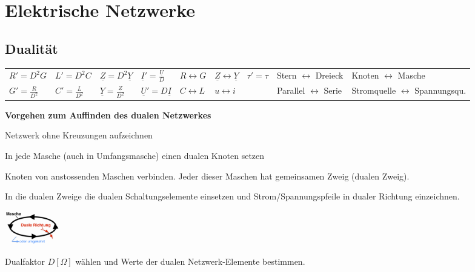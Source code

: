 \section{Elektrische Netzwerke}
\subsection{Dualität}
\begin{tabular}{llll|lllll}
	$R'=D^2G$ & 
	$L'=D^2C$ & 
	$\underline{Z} = D^2 \underline{Y}$ &  $\underline{I}'=\frac{\underline{U}}{D}$
	
	&  $R \leftrightarrow G $
	&  $\underline{Z} \leftrightarrow \underline{Y}$
	&  $\tau' = \tau$
	& Stern $\leftrightarrow$ Dreieck
	&  Knoten $\leftrightarrow$ Masche \\

	$G'=\frac{R}{D^2}$  & $C'=\frac{L}{D^2}$ & 
	$\underline{Y} = \frac{\underline{Z}}{D^2}$ & $\underline{U}'=D\underline{I}$
	
	& $C \leftrightarrow L$
	& $u \leftrightarrow i$ 
	& 
	& Parallel $\leftrightarrow$ Serie 
	& Stromquelle $\leftrightarrow$ Spannungsqu.\\
\end{tabular}

\textbf{Vorgehen zum Auffinden des dualen Netzwerkes}
\begin{enumerate}[itemsep=1ex, nosep]
	\item Netzwerk ohne Kreuzungen aufzeichnen
	\item In jede Masche (auch in Umfangsmasche) einen dualen Knoten setzen
	\item Knoten von anstossenden Maschen verbinden. Jeder dieser Maschen hat
	gemeinsamen Zweig (dualen Zweig).\\
	\begin{minipage}{14cm}
		\item In die dualen Zweige die dualen Schaltungselemente einsetzen und Strom/Spannungspfeile in dualer Richtung einzeichnen.
	\end{minipage}
	\parbox[c]{2.5cm}{
		\includegraphics[width = 2.5cm]{./bilder/Duale_Richtung}}
	\item Dualfaktor $D [\Omega]$ wählen und Werte der dualen Netzwerk-Elemente
	bestimmen.
	
\end{enumerate}

